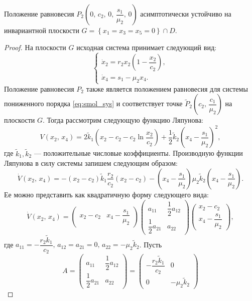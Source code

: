 \documentclass[14pt,a4paper]{extarticle}
\begin{document}
	\begin{theorem}\label{th:P2_stab}
		Положение равновесия $P_2\left(0,\, c_2,\,0,\,\dfrac{s_1}{\mu_2},\, 0\right)$ асимптотически устойчиво на инвариантной плоскости $G=\left\{x_1=x_3=x_5=0\right\}\cap D$. 
	\end{theorem}
	\begin{proof}
		На плоскости $G$ исходная система принимает следующий вид:
		\begin{equation}\label{eq:smol_sys}
			\begin{cases}
				\dot{x}_2=r_2x_2\left(1-\dfrac{x_2}{c_2}\right),\\
				\dot{x}_4=s_1-\mu_2x_4.
			\end{cases}
		\end{equation}
		Положение равновесия $P_2$ также является положением равновесия для системы пониженного порядка \ref{eq:smol_sys} и соответствует точке $\tilde{P}_2\left(c_2,\, \dfrac{c_1}{\mu_2}\right)$ на плоскости $G$. Тогда рассмотрим следующую функцию Ляпунова:
		\[V(x_2,\, x_4)=2\tilde{k}_1\left(x_2-c_2-c_2\ln\dfrac{x_2}{c_2}\right)+\dfrac{1}{2}\tilde{k}_2\left(x_4-\dfrac{s_1}{\mu_2}\right)^2,\]
		где $\tilde{k}_1,\tilde{k}_2$ --- положительные числовые коэффициенты. Производную функции Ляпунова в силу системы запишем следующим образом:
		\[\dot{V}(x_2,\,x_4)=-(x_2-c_2)\tilde{k}_1\dfrac{r_2}{c_2}(x_2-c_2)-\left(x_4-\dfrac{s_1}{\mu_2}\right)\mu_2\tilde{k}_2\left(x_4-\dfrac{s_1}{\mu_2}\right).\]
		Ее можно представить как квадратичную форму следующего вида:
		\[\dot{V}(x_2,\, x_4)=\begin{pmatrix}
			x_2-c_2 & x_4-\dfrac{s_1}{\mu_2}
		\end{pmatrix}\begin{pmatrix}
			a_{11} & \dfrac{1}{2}a_{12}\\
			\dfrac{1}{2}a_{21} & a_{22}
		\end{pmatrix}\begin{pmatrix}
			x_2-c_2\\
			x_4-\dfrac{s_1}{\mu_2}
		\end{pmatrix},\]
		где $a_{11}=-\dfrac{r_2\tilde{k}_1}{c_2},\, a_{12}=a_{21}=0,\, a_{22}=-\mu_2\tilde{k}_2$. Пусть
		\[A=\begin{pmatrix}
			a_{11} & \dfrac{1}{2}a_{12}\\
			\dfrac{1}{2}a_{21} & a_{22}
		\end{pmatrix}=\begin{pmatrix}
			-\dfrac{r_2\tilde{k}_1}{c_2} & 0\\
			0 & -\mu_2\tilde{k}_2

\end{pmatrix}\]
\end{proof}
\end{document}
